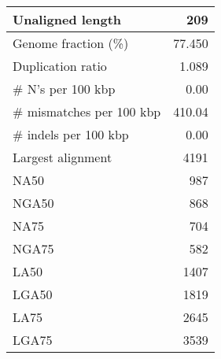 \documentclass[12pt,a4paper]{article}
\begin{document}
\begin{table}[ht]
\begin{center}
\begin{tabular}{|l*{1}{|r}|}
Unaligned length & 209 \\ \hline
Genome fraction (\%) & 77.450 \\ \hline
Duplication ratio & 1.089 \\ \hline
\# N's per 100 kbp & 0.00 \\ \hline
\# mismatches per 100 kbp & 410.04 \\ \hline
\# indels per 100 kbp & 0.00 \\ \hline
Largest alignment & 4191 \\ \hline
NA50 & 987 \\ \hline
NGA50 & 868 \\ \hline
NA75 & 704 \\ \hline
NGA75 & 582 \\ \hline
LA50 & 1407 \\ \hline
LGA50 & 1819 \\ \hline
LA75 & 2645 \\ \hline
LGA75 & 3539 \\ \hline
\end{tabular}
\end{center}
\end{table}
\end{document}
